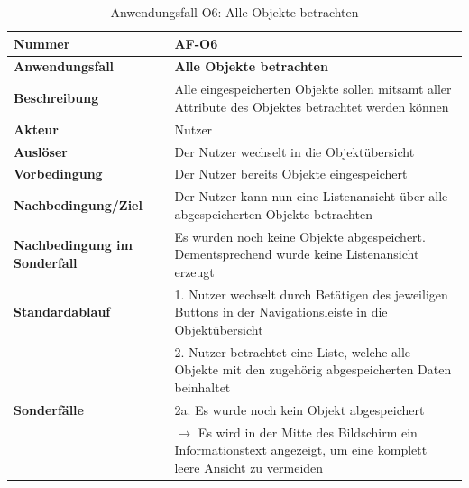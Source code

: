 \documentclass[oneside]{ausarbeitung}
\begin{document}
\begin{table}[htbp]
	\centering
	\begin{tabular}{|l|p{80mm}|}
		\hline
		\textbf{Nummer} & \textbf{AF-O6} \\ \hline
		\textbf{Anwendungsfall} & \textbf{Alle Objekte betrachten} \\ \hline
		\textbf{Beschreibung} & Alle eingespeicherten Objekte sollen mitsamt aller Attribute des Objektes betrachtet werden können \\ \hline
		\textbf{Akteur} & Nutzer \\ \hline
		\textbf{Auslöser} & Der Nutzer wechselt in die Objektübersicht  \\ \hline
		\textbf{Vorbedingung} & Der Nutzer bereits Objekte eingespeichert \\ \hline	
		\textbf{Nachbedingung/Ziel} & Der Nutzer kann nun eine Listenansicht über alle abgespeicherten Objekte betrachten \\ \hline
		\textbf{Nachbedingung im Sonderfall} & Es wurden noch keine Objekte abgespeichert. Dementsprechend wurde keine Listenansicht erzeugt \\ \hline
		\textbf{Standardablauf} & 1. Nutzer wechselt durch Betätigen des jeweiligen Buttons in der Navigationsleiste in die Objektübersicht \\
		& 2. Nutzer betrachtet eine Liste, welche alle Objekte mit den zugehörig abgespeicherten Daten beinhaltet \\ \hline
		\textbf{Sonderfälle} & 2a. Es wurde noch kein Objekt abgespeichert \\ & $\rightarrow$ Es wird in der Mitte des Bildschirm ein Informationstext angezeigt, um eine komplett leere Ansicht zu vermeiden \\ \hline
		
	\end{tabular}
	\caption{Anwendungsfall O6: Alle Objekte betrachten}
	\label{tab:use-case-view-objects}
\end{table}
\end{document}
